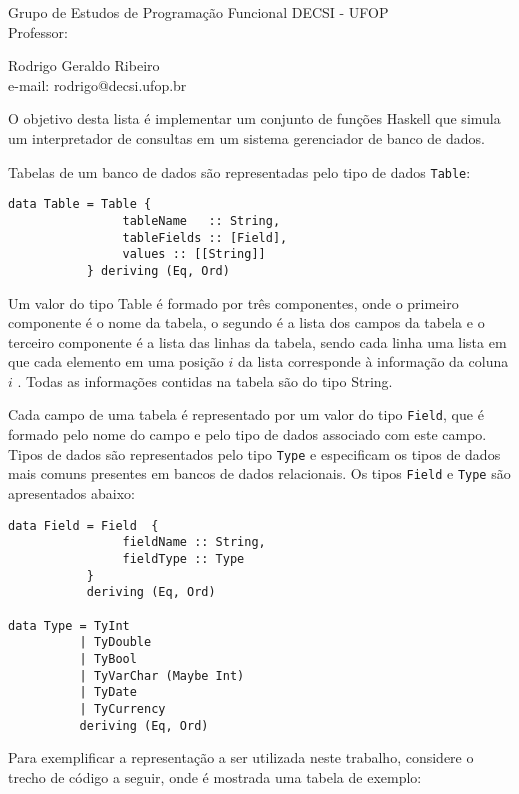 \documentclass[11pt,a4paper]{report}
\begin{document}
 
\noindent Grupo de Estudos de Programa\c{c}\~ao Funcional
 \hfill DECSI - UFOP \\
Professor: \parbox[t]{14cm}{Rodrigo Geraldo Ribeiro \\
                     e-mail: rodrigo@decsi.ufop.br}
 
\vspace*{3mm}
 O objetivo desta lista \'e implementar um conjunto de fun\c{c}\~oes Haskell que simula um interpretador de consultas
 em um sistema gerenciador de banco de dados. 
	           
	           Tabelas de um banco de dados s\~ao representadas pelo tipo de dados \texttt{Table}:
\begin{verbatim}
data Table = Table {
                tableName   :: String,   
                tableFields :: [Field],
                values :: [[String]]
           } deriving (Eq, Ord)
\end{verbatim}
Um valor do tipo Table \'e formado por tr\^es componentes, onde o primeiro componente \'e o nome da tabela, 
o segundo \'e a lista dos campos da tabela e o terceiro componente \'e a lista das linhas da tabela, sendo cada linha
uma lista em que cada elemento em uma posi\c{c}\~ao $i$ da lista corresponde \`a informa\c{c}\~ao da coluna $i$ . 
Todas as informa\c{c}\~oes contidas na tabela s\~ao do tipo String.

Cada campo de uma tabela \'e representado por um valor do tipo \texttt{Field}, que \'e formado pelo nome do campo e pelo
tipo de dados associado com este campo. Tipos de dados s\~ao representados pelo tipo \texttt{Type} e especificam os
 tipos de dados mais comuns presentes em bancos de dados relacionais. Os tipos \texttt{Field} e \texttt{Type} s\~ao
 apresentados abaixo:

\begin{verbatim}
data Field = Field  {
                fieldName :: String, 
                fieldType :: Type    
           }           
           deriving (Eq, Ord)

data Type = TyInt
          | TyDouble                         
          | TyBool                           
          | TyVarChar (Maybe Int)             
          | TyDate                           
          | TyCurrency                       
          deriving (Eq, Ord)
\end{verbatim}

Para exemplificar a representa\c{c}\~ao a ser utilizada neste trabalho, considere o trecho de c\'odigo a seguir, onde \'e
mostrada uma tabela de exemplo:
\end{document}
